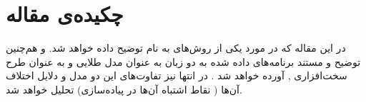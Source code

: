 \chapter*{
چکیده‌ی مقاله
}
\pagestyle{empty}

در این مقاله که در مورد یکی از روش‌های   به نام  توضیح داده خواهد شد. و هم‌چنین توضیح و مستند برنامه‌های داده شده به دو زبان  به عنوان مدل طلایی و  به عنوان طرح سخت‌افزاری , آورده خواهد شد .
در انتها نیز تفاوت‌های این دو مدل و دلایل اختلاف آن‌ها (‌ نقاط اشتباه آن‌ها در پیاده‌سازی) تحلیل خواهد شد.